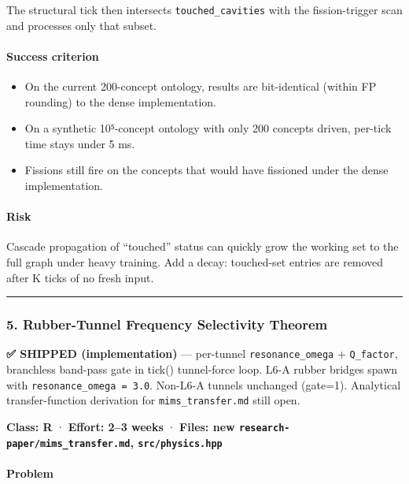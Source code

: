 \documentclass[
  11pt,
  a4paper,
]{article}
\providecommand{\tightlist}{%
  \setlength{\itemsep}{0pt}\setlength{\parskip}{0pt}}
\begin{document}
The structural tick then intersects \texttt{touched\_cavities} with the
fission-trigger scan and processes only that subset.

\paragraph{Success criterion}\label{success-criterion-3}

\begin{itemize}
\tightlist
\item
  On the current 200-concept ontology, results are bit-identical (within
  FP rounding) to the dense implementation.
\item
  On a synthetic 10⁵-concept ontology with only 200 concepts driven,
  per-tick time stays under 5 ms.
\item
  Fissions still fire on the concepts that would have fissioned under
  the dense implementation.
\end{itemize}

\paragraph{Risk}\label{risk-1}

Cascade propagation of ``touched'' status can quickly grow the working
set to the full graph under heavy training. Add a decay: touched-set
entries are removed after K ticks of no fresh input.

\begin{center}\rule{0.5\linewidth}{0.5pt}\end{center}

\subsubsection{5. Rubber-Tunnel Frequency Selectivity
Theorem}\label{rubber-tunnel-frequency-selectivity-theorem-1}

\textbf{✅ SHIPPED (implementation)} --- per-tunnel
\texttt{resonance\_omega} + \texttt{Q\_factor}, branchless band-pass
gate in tick() tunnel-force loop. L6-A rubber bridges spawn with
\texttt{resonance\_omega\ =\ 3.0}. Non-L6-A tunnels unchanged (gate=1).
Analytical transfer-function derivation for \texttt{mims\_transfer.md}
still open.

\textbf{Class: R} · \textbf{Effort: 2--3 weeks} · \textbf{Files: new
\texttt{research-paper/mims\_transfer.md}, \texttt{src/physics.hpp}}

\paragraph{Problem}\label{problem-4}
\end{document}

